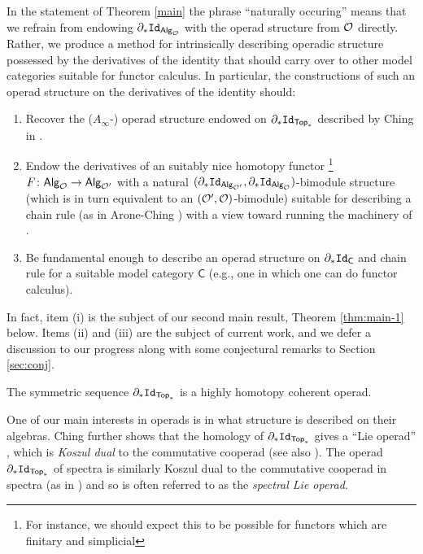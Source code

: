 \begin{remark} \label{sec:remark}
In the statement of Theorem \ref{main} the phrase ``naturally occuring'' means that we refrain from endowing $\partial_* \mathtt{Id}_{{\mathsf{Alg}_{\mathcal{O}}}}$ with the operad structure from $\mathcal{O}$ directly. Rather, we produce a method for intrinsically describing operadic structure possessed by the derivatives of the identity that should carry over to other model categories suitable for functor calculus. In particular, the constructions of such an operad structure on the derivatives of the identity should:

 \begin{enumerate}[label=(\roman*)] 
\item Recover the ($A_{\infty}$-) operad structure endowed on $\partial_* \mathtt{Id}_{\mathsf{Top}_*}$ described by Ching in \cite{Ching-thesis}.

\item Endow the derivatives of an suitably nice homotopy functor  \footnote{For instance, we should expect this to be possible for functors which are finitary and simplicial} $F\colon {\mathsf{Alg}_{\mathcal{O}}}\to {\mathsf{Alg}_{\mathcal{O'}}}$ with a natural $(\partial_* \mathtt{Id}_{{\mathsf{Alg}_{\mathcal{O'}}}}, \partial_* \mathtt{Id}_{{\mathsf{Alg}_{\mathcal{O}}}})$-bimodule structure (which is in turn equivalent to an $(\mathcal{O}',\mathcal{O})$-bimodule) suitable for describing a chain rule (as in Arone-Ching \cite{AC-1}) with a view toward running the machinery of \cite{AC-coalg}.

\item Be fundamental enough to describe an operad structure on $\partial_* \mathtt{Id}_{\mathsf{C}}$ and chain rule for a suitable model category $\mathsf{C}$ (e.g.,  one in which one can do functor calculus).
\end{enumerate}

In fact, item (i) is the subject of our second main result, Theorem \ref{thm:main-1} below. Items (ii) and (iii) are the subject of current work, and we defer a discussion to our progress along with some conjectural remarks to Section \ref{sec:conj}. \end{remark}

 \begin{theorem} \label{thm:main-1}
The symmetric sequence $\partial_*\mathtt{Id}_{\mathsf{Top}_*}$ is a highly homotopy coherent operad.
\end{theorem}

One of our main interests in operads is in what structure is described on their algebras. Ching further shows that the homology of $\partial_*\mathtt{Id}_{\mathsf{Top}_*}$ gives a ``Lie operad'' \cite{Ching-thesis}, which is \textit{Koszul dual} to the commutative cooperad \cite{Ginz-Kap} (see also \cite{Get-Jon}). The operad $\partial_*\mathtt{Id}_{\mathsf{Top}_*}$ of spectra is similarly Koszul dual to the commutative cooperad in spectra (as in \cite{FG}) and so is often referred to as the \textit{spectral Lie operad}.

